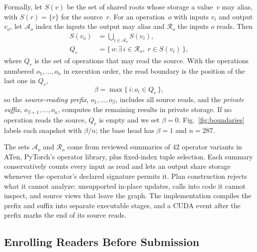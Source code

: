 \documentclass[conference]{IEEEtran}
\begin{document}
Formally, let $S(v)$ be the set of shared roots whose storage a value~$v$ may alias, with $S(r)=\{r\}$ for the source~$r$. For an operation~$o$ with inputs $v_i$ and output $v_o$, let $\mathcal{A}_o$ index the inputs the output may alias and $\mathcal{R}_o$ the inputs $o$ reads. Then
\begin{equation}
\begin{aligned}
S(v_o)&=\textstyle\bigcup_{i\in \mathcal{A}_o} S(v_i),\\
Q_r&=\{\, o : \exists\, i\in \mathcal{R}_o,\; r\in S(v_i) \,\},
\end{aligned}\label{eq:reads}
\end{equation}
where $Q_r$ is the set of operations that may read the source. With the operations numbered $o_1,\dots,o_n$ in execution order, the read boundary is the position of the last one in $Q_r$,
\begin{equation}
\beta=\max\{\, i : o_i\in Q_r \,\}, \label{eq:boundary}
\end{equation}
so the \emph{source-reading prefix}, $o_1,\dots,o_\beta$, includes all source reads, and the \emph{private suffix}, $o_{\beta+1},\dots,o_n$, computes the remaining results in private storage. If no operation reads the source, $Q_r$ is empty and we set $\beta=0$. Fig.~\ref{fig:boundaries} labels each snapshot with $\beta/n$; the base head has $\beta=1$ and $n=287$.

The sets $\mathcal{A}_o$ and $\mathcal{R}_o$ come from reviewed summaries of 42 operator variants in ATen, PyTorch's operator library, plus fixed-index tuple selection. Each summary conservatively counts every input as read and lets an output share storage whenever the operator's declared signature permits it. Plan construction rejects what it cannot analyze: unsupported in-place updates, calls into code it cannot inspect, and source views that leave the graph. The implementation compiles the prefix and suffix into separate executable stages, and a CUDA event after the prefix marks the end of its source reads.

\subsection{Enrolling Readers Before Submission}
\label{sec:enroll}
\end{document}
